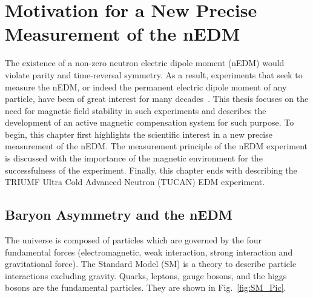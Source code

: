 \chapter{Motivation for a New Precise Measurement of the nEDM}
\label{ch:motivation} 

The existence of a non-zero neutron electric dipole moment (nEDM) would violate parity and
time-reversal symmetry. As a result, experiments that seek to measure the nEDM,
or indeed the permanent electric dipole moment of any particle, have been of great
interest for many decades~\cite{Chupp}. This thesis focuses on the
need for magnetic field stability in such experiments and describes the development
of an active magnetic compensation system for such purpose.
To begin, this chapter first highlights the scientific interest in a new precise measurement of the nEDM. The measurement principle of the nEDM experiment is discussed with the importance of the magnetic environment for the successfulness of the experiment. Finally, this chapter ends with describing the
TRIUMF Ultra Cold Advanced Neutron (TUCAN) EDM experiment.




\section{Baryon Asymmetry and the nEDM}


The universe is composed of particles which are governed by the four fundamental forces (electromagnetic, weak interaction, strong interaction and gravitational force). The Standard Model (SM) is a theory to describe particle interactions excluding gravity. Quarks, leptons, gauge bosons, and the higgs bosons are the fundamental particles. They are shown in Fig.~\ref{fig:SM_Pic}. 

